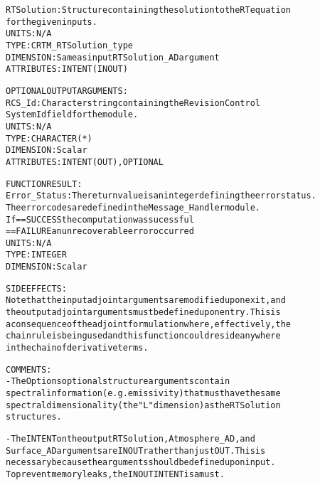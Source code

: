 \begin{alltt}
        RTSolution:     Structure containing the solution to the RT equation
                        for the given inputs.
                        UNITS:      N/A
                        TYPE:       CRTM_RTSolution_type
                        DIMENSION:  Same as input RTSolution_AD argument
                        ATTRIBUTES: INTENT(IN OUT)
 
  OPTIONAL OUTPUT ARGUMENTS:
        RCS_Id:         Character string containing the Revision Control
                        System Id field for the module.
                        UNITS:      N/A
                        TYPE:       CHARACTER(*)
                        DIMENSION:  Scalar
                        ATTRIBUTES: INTENT(OUT), OPTIONAL
 
  FUNCTION RESULT:
        Error_Status:   The return value is an integer defining the error status.
                        The error codes are defined in the Message_Handler module.
                        If == SUCCESS the computation was sucessful
                           == FAILURE an unrecoverable error occurred
                        UNITS:      N/A
                        TYPE:       INTEGER
                        DIMENSION:  Scalar
 
  SIDE EFFECTS:
       Note that the input adjoint arguments are modified upon exit, and
       the output adjoint arguments must be defined upon entry. This is
       a consequence of the adjoint formulation where, effectively, the
       chain rule is being used and this function could reside anywhere
       in the chain of derivative terms.
 
  COMMENTS:
        - The Options optional structure arguments contain
          spectral information (e.g. emissivity) that must have the same
          spectral dimensionality (the "L" dimension) as the RTSolution
          structures.
 
        - The INTENT on the output RTSolution, Atmosphere_AD, and
          Surface_AD arguments are IN OUT rather than just OUT. This is
          necessary because the arguments should be defined upon input.
          To prevent memory leaks, the IN OUT INTENT is a must.
 
  \end{alltt}
